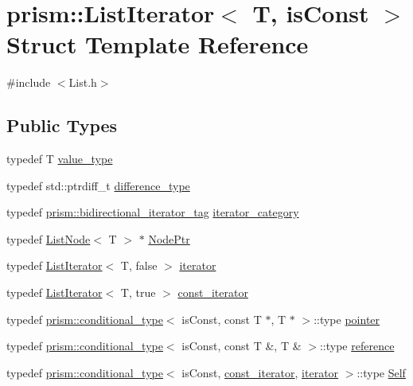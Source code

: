 \hypertarget{structprism_1_1_list_iterator}{}\section{prism\+:\+:List\+Iterator$<$ T, is\+Const $>$ Struct Template Reference}
\label{structprism_1_1_list_iterator}


{\ttfamily \#include $<$List.\+h$>$}

\subsection*{Public Types}
\begin{DoxyCompactItemize}
\item 
typedef T \hyperlink{structprism_1_1_list_iterator_a8b0844caeee92f469961951784b675fa}{value\+\_\+type}
\item 
typedef std\+::ptrdiff\+\_\+t \hyperlink{structprism_1_1_list_iterator_a81d24e551a1b9ef7397d37b7d92511cf}{difference\+\_\+type}
\item 
typedef \hyperlink{structprism_1_1bidirectional__iterator__tag}{prism\+::bidirectional\+\_\+iterator\+\_\+tag} \hyperlink{structprism_1_1_list_iterator_ae5286e35b86909c6990d328423bf3641}{iterator\+\_\+category}
\item 
typedef \hyperlink{structprism_1_1_list_node}{List\+Node}$<$ T $>$ $\ast$ \hyperlink{structprism_1_1_list_iterator_aad2175a44d3db4fd84059ae15158b174}{Node\+Ptr}
\item 
typedef \hyperlink{structprism_1_1_list_iterator}{List\+Iterator}$<$ T, false $>$ \hyperlink{structprism_1_1_list_iterator_a91ccdd8512cbc8314d784e39ed4597dd}{iterator}
\item 
typedef \hyperlink{structprism_1_1_list_iterator}{List\+Iterator}$<$ T, true $>$ \hyperlink{structprism_1_1_list_iterator_aec39e76f7b988d0718fa4e2aea52ed34}{const\+\_\+iterator}
\item 
typedef \hyperlink{structprism_1_1conditional__type}{prism\+::conditional\+\_\+type}$<$ is\+Const, const T $\ast$, T $\ast$ $>$\+::type \hyperlink{structprism_1_1_list_iterator_adb94db3cc26f2df6b6962b756b6fa3c3}{pointer}
\item 
typedef \hyperlink{structprism_1_1conditional__type}{prism\+::conditional\+\_\+type}$<$ is\+Const, const T \&, T \& $>$\+::type \hyperlink{structprism_1_1_list_iterator_a8a07c86e6d1ef38b0f7d390ad7c05c22}{reference}
\item 
typedef \hyperlink{structprism_1_1conditional__type}{prism\+::conditional\+\_\+type}$<$ is\+Const, \hyperlink{structprism_1_1_list_iterator_aec39e76f7b988d0718fa4e2aea52ed34}{const\+\_\+iterator}, \hyperlink{structprism_1_1_list_iterator_a91ccdd8512cbc8314d784e39ed4597dd}{iterator} $>$\+::type \hyperlink{structprism_1_1_list_iterator_a54dfed5d1937a612aa2ae524b55f8087}{Self}
\end{DoxyCompactItemize}
